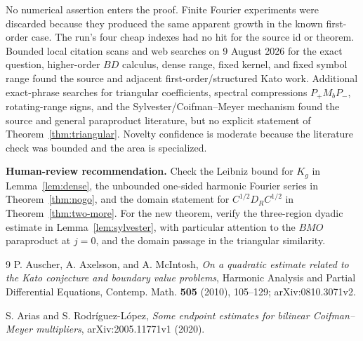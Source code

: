 \documentclass[11pt]{article}
\begin{document}
No numerical assertion enters the proof. Finite Fourier experiments were
discarded because they produced the same apparent growth in the known
first-order case. The run's four cheap indexes had no hit for the source id or
theorem. Bounded local citation scans and web searches on 9 August 2026 for the
exact question, higher-order $BD$ calculus, dense range, fixed kernel, and
fixed symbol range found the source and adjacent first-order/structured Kato
work.  Additional exact-phrase searches for triangular coefficients,
spectral compressions $P_+M_bP_-$, rotating-range signs, and the
Sylvester/Coifman--Meyer mechanism found the source and general paraproduct
literature, but no explicit statement of
Theorem~\ref{thm:triangular}. Novelty confidence is moderate because the
literature check was bounded and the area is specialized.

\textbf{Human-review recommendation.} Check the Leibniz bound for $K_g$ in
Lemma~\ref{lem:dense}, the unbounded one-sided harmonic Fourier series in
Theorem~\ref{thm:nogo}, and the domain statement for
$C^{1/2}D_RC^{1/2}$ in Theorem~\ref{thm:two-more}.  For the new theorem,
verify the three-region dyadic estimate in Lemma~\ref{lem:sylvester}, with
particular attention to the $BMO$ paraproduct at $j=0$, and the domain passage
in the triangular similarity.

\begin{thebibliography}{9}
P. Auscher, A. Axelsson, and A. McIntosh,
\emph{On a quadratic estimate related to the Kato conjecture and boundary
value problems}, Harmonic Analysis and Partial Differential Equations,
Contemp. Math. \textbf{505} (2010), 105--129; arXiv:0810.3071v2.

S. Arias and S. Rodr\'iguez-L\'opez,
\emph{Some endpoint estimates for bilinear Coifman--Meyer multipliers},
arXiv:2005.11771v1 (2020).
\end{thebibliography}
\end{document}
